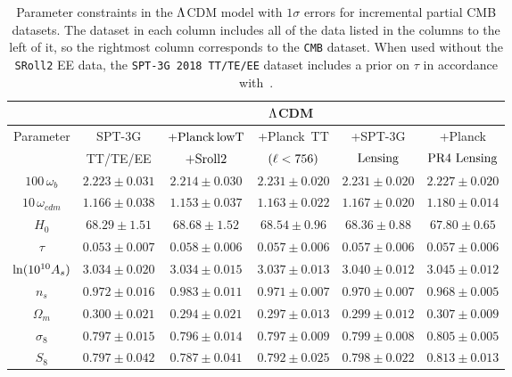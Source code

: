 \documentclass[12pt,a4paper]{article}
\newcommand\?{/\hspace{0pt}}
\begin{document}
\begin{table}
    \small
	\centering
	\begin{tabular} {|c||c|c|c|c|c|}
		\hline
		& \multicolumn{5}{c|}{$\rm \Lambda$CDM} \\
		\hline
		\hline
		\multirow{2}{*}{\!\!\! Parameter\!} &  SPT-3G & $\rm +Planck\,lowT$ & +Planck \,TT & +SPT-3G & +Planck 
		\\
		& TT/TE/EE & $\rm +Sroll2$ & $\rm (\ell<756)$ & $\rm Lensing$ & $\rm PR4~Lensing$ \\
		\hline
		$100\,\omega_b$ & $2.223\pm0.031$ &
		$2.214\pm0.030$ &
		$2.231\pm0.020$ &
        $2.231\pm0.020$ &
		$2.227\pm0.020$  \\ %
		$10\,\omega_{cdm}$ & $1.166\pm0.038$ &
		$1.153\pm0.037$ &
		$1.163\pm0.022$ &
        $1.167\pm0.020$ &
		$1.180\pm0.014$ \\ %
		$H_0$ & $68.29\pm1.51$ &
		$68.68\pm1.52$ &
		$68.54\pm0.96$ &
        $68.36\pm0.88$ &
		$67.80\pm0.65$ \\
		$\tau$ & $0.053\pm0.007$ &
		$0.058\pm0.006$ &
		$0.057\pm0.006$ &
        $0.057\pm0.006$ &
		$0.057\pm0.006$ \\ %
		$\!{\rm ln}(10^{10} A_s)\!$ & $3.034\pm0.020$ &
		$3.034\pm0.015$ &
		$3.037\pm0.013$ &
        $3.040\pm0.012$ &
		$3.045\pm0.012$ \\ %
		$n_s$ & $0.972\pm0.016$ &
		$0.983\pm0.011$ &
		$0.971\pm0.007$ &
        $0.970\pm0.007$ &
		$0.968\pm0.005$ \\ %
		\hline   
		$\Omega_m$ & $0.300\pm0.021$ &
		$0.294\pm0.021$ &
		$0.297\pm0.013$ &
        $0.299\pm0.012$ &
		$0.307\pm0.009$ \\ %
		$\sigma_8$ & $0.797\pm0.015$ &
		$0.796\pm0.014$ &
		$0.797\pm0.009$ &
        $0.799\pm0.008$ &
		$0.805\pm0.005$ \\ %
		$S_8$ & $0.797\pm0.042$ &
		$0.787\pm0.041$ &
		$0.792\pm0.025$ &
        $0.798\pm0.022$ &
		$0.813\pm0.013$ \\
		\hline
	\end{tabular}
	\caption {Parameter constraints in the $\rm \Lambda$CDM model with $1\sigma$ errors for incremental partial CMB datasets. The dataset in each column includes all of the data listed in the columns to the left of it, so the rightmost column corresponds to the \texttt{CMB} dataset.
    When used without the \texttt{SRoll2} EE data, the \texttt{SPT-3G 2018 TT/TE/EE} dataset includes a prior on $\tau$ in accordance with~\cite{SPT-3G:2022hvq}.}
	\label{tab:tLCDM1}
\end{table}
\end{document}
